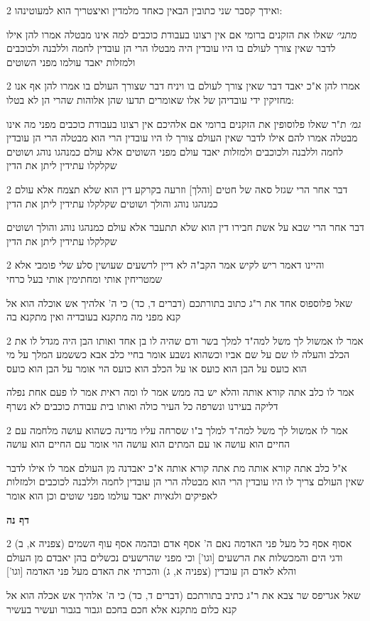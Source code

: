 \documentclass[12pt, openany]{book}
\newcommand{\sethebfont}{
\fontsize{10.5pt}{21.0pt} \selectfont
}
\newcommand{\twocol}[1]{
	{\sethebfont \begin{multicols}{2}
			#1
	\end{multicols}}	
}
\newcommand{\sectname}{}
\newcommand{\newsection}[1]{
	\addcontentsline{toc}{section}{#1}
	\renewcommand{\sectname}{#1}	
	\vspace{-\baselineskip}
	\begin{center}
		\textbf{%
\fontsize{16pt}{16pt}\selectfont
			#1}
	\end{center}
	\vspace{-\baselineskip}
	\nopagebreak
}
\begin{document}
\twocol{ואידך קסבר שני כתובין הבאין כאחד מלמדין ואיצטריך הוא למעוטינהו:
\par {\large\emph{מתני׳}} שאלו את הזקנים ברומי אם אין רצונו בעבודת כוכבים למה אינו מבטלה אמרו להן אילו לדבר שאין צורך לעולם בו היו עובדין היה מבטלו הרי הן עובדין לחמה וללבנה ולכוכבים ולמזלות יאבד עולמו מפני השוטים}
\twocol{אמרו להן א"כ יאבד דבר שאין צורך לעולם בו ויניח דבר שצורך העולם בו אמרו להן אף אנו מחזיקין ידי עובדיהן של אלו שאומרים תדעו שהן אלוהות שהרי הן לא בטלו:
\par {\large\emph{גמ׳}} ת"ר שאלו פלוסופין את הזקנים ברומי אם אלהיכם אין רצונו בעבודת כוכבים מפני מה אינו מבטלה אמרו להם אילו לדבר שאין העולם צורך לו היו עובדין הרי הוא מבטלה הרי הן עובדין לחמה וללבנה ולכוכבים ולמזלות יאבד עולם מפני השוטים אלא עולם כמנהגו נוהג ושוטים שקלקלו עתידין ליתן את הדין}
\twocol{דבר אחר הרי שגזל סאה של חטים [והלך] וזרעה בקרקע דין הוא שלא תצמח אלא עולם כמנהגו נוהג והולך ושוטים שקלקלו עתידין ליתן את הדין
\par דבר אחר הרי שבא על אשת חבירו דין הוא שלא תתעבר אלא עולם כמנהגו נוהג והולך ושוטים שקלקלו עתידין ליתן את הדין}
\twocol{והיינו דאמר ריש לקיש אמר הקב"ה לא דיין לרשעים שעושין סלע שלי פומבי אלא שמטריחין אותי ומחתימין אותי בעל כרחי
\par שאל פלוספוס אחד את ר"ג כתוב בתורתכם (דברים ד, כד) כי ה' אלהיך אש אוכלה הוא אל קנא מפני מה מתקנא בעובדיה ואין מתקנא בה}
\twocol{אמר לו אמשול לך משל למה"ד למלך בשר ודם שהיה לו בן אחד ואותו הבן היה מגדל לו את הכלב והעלה לו שם על שם אביו וכשהוא נשבע אומר בחיי כלב אבא כששמע המלך על מי הוא כועס על הבן הוא כועס או על הכלב הוא כועס הוי אומר על הבן הוא כועס
\par אמר לו כלב אתה קורא אותה והלא יש בה ממש אמר לו ומה ראית אמר לו פעם אחת נפלה דליקה בעירנו ונשרפה כל העיר כולה ואותו בית עבודת כוכבים לא נשרף}
\twocol{אמר לו אמשול לך משל למה"ד למלך ב"ו שסרחה עליו מדינה כשהוא עושה מלחמה עם החיים הוא עושה או עם המתים הוא עושה הוי אומר עם החיים הוא עושה
\par א"ל כלב אתה קורא אותה מת אתה קורא אותה א"כ יאבדנה מן העולם אמר לו אילו לדבר שאין העולם צריך לו היו עובדין הרי הוא מבטלה הרי הן עובדין לחמה וללבנה לכוכבים ולמזלות לאפיקים ולגאיות יאבד עולמו מפני שוטים וכן הוא אומר}
\newsection{דף נה}
\twocol{(צפניה א, ב) אסוף אסף כל מעל פני האדמה נאם ה' אסף אדם ובהמה אסף עוף השמים ודגי הים והמכשלות את הרשעים [וגו'] וכי מפני שהרשעים נכשלים בהן יאבדם מן העולם והלא לאדם הן עובדין (צפניה א, ג) והכרתי את האדם מעל פני האדמה [וגו']
\par שאל אגריפס שר צבא את ר"ג כתיב בתורתכם (דברים ד, כד) כי ה' אלהיך אש אכלה הוא אל קנא כלום מתקנא אלא חכם בחכם וגבור בגבור ועשיר בעשיר}
\end{document}
